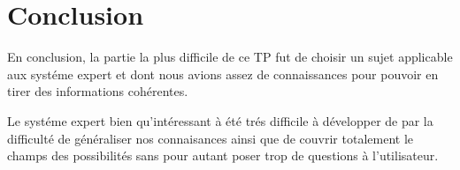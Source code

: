 \documentclass[a4paper, 10pt, leqno]{report}
\theoremstyle{plain}
\begin{document}
\chapter*{Conclusion}

En conclusion, la partie la plus difficile de ce TP fut de choisir un sujet applicable aux systéme expert et dont nous avions assez de connaissances pour pouvoir en tirer des informations cohérentes. 

Le systéme expert bien qu'intéressant à été trés difficile à développer de par la difficulté de généraliser nos connaisances ainsi que de couvrir totalement le champs des possibilités sans pour autant poser trop de questions à l'utilisateur.
\end{document}
